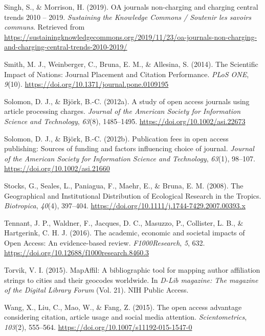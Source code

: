 \documentclass[english,man]{apa6}
\begin{document}
\leavevmode\hypertarget{ref-singh_oa_2019}{}%
Singh, S., \& Morrison, H. (2019). OA journals non-charging and charging central trends 2010 -- 2019. \emph{Sustaining the Knowledge Commons / Soutenir les savoirs communs}. Retrieved from \url{https://sustainingknowledgecommons.org/2019/11/23/oa-journals-non-charging-and-charging-central-trends-2010-2019/}

\leavevmode\hypertarget{ref-smith_scientific_2014}{}%
Smith, M. J., Weinberger, C., Bruna, E. M., \& Allesina, S. (2014). The Scientific Impact of Nations: Journal Placement and Citation Performance. \emph{PLoS ONE}, \emph{9}(10). \url{https://doi.org/10.1371/journal.pone.0109195}

\leavevmode\hypertarget{ref-solomon_study_2012}{}%
Solomon, D. J., \& Björk, B.-C. (2012a). A study of open access journals using article processing charges. \emph{Journal of the American Society for Information Science and Technology}, \emph{63}(8), 1485--1495. \url{https://doi.org/10.1002/asi.22673}

\leavevmode\hypertarget{ref-solomon_publication_2012}{}%
Solomon, D. J., \& Björk, B.-C. (2012b). Publication fees in open access publishing: Sources of funding and factors influencing choice of journal. \emph{Journal of the American Society for Information Science and Technology}, \emph{63}(1), 98--107. \url{https://doi.org/10.1002/asi.21660}

\leavevmode\hypertarget{ref-stocks_geographical_2008}{}%
Stocks, G., Seales, L., Paniagua, F., Maehr, E., \& Bruna, E. M. (2008). The Geographical and Institutional Distribution of Ecological Research in the Tropics. \emph{Biotropica}, \emph{40}(4), 397--404. \url{https://doi.org/10.1111/j.1744-7429.2007.00393.x}

\leavevmode\hypertarget{ref-tennant_academic_2016}{}%
Tennant, J. P., Waldner, F., Jacques, D. C., Masuzzo, P., Collister, L. B., \& Hartgerink, C. H. J. (2016). The academic, economic and societal impacts of Open Access: An evidence-based review. \emph{F1000Research}, \emph{5}, 632. \url{https://doi.org/10.12688/f1000research.8460.3}

\leavevmode\hypertarget{ref-torvik_mapaffil_2015}{}%
Torvik, V. I. (2015). MapAffil: A bibliographic tool for mapping author affiliation strings to cities and their geocodes worldwide. In \emph{D-Lib magazine: The magazine of the Digital Library Forum} (Vol. 21). NIH Public Access.

\leavevmode\hypertarget{ref-wang_open_2015}{}%
Wang, X., Liu, C., Mao, W., \& Fang, Z. (2015). The open access advantage considering citation, article usage and social media attention. \emph{Scientometrics}, \emph{103}(2), 555--564. \url{https://doi.org/10.1007/s11192-015-1547-0}
\end{document}

